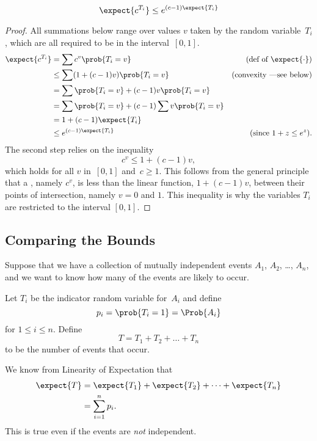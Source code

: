 \begin{lemma}
\label{chernoff-lemma2}
\[
    \expect{c^{T_i}} \leq e^{(c - 1) \expect{T_i}}
\]
\end{lemma}

\begin{proof}
All summations below range over values $v$ taken by the random
variable~$T_i$, which are all required to be in the interval~$[0, 1]$.
\begin{align*}
\expect{c^{T_i}}
     & = \sum c^v \prob{T_i = v}
              & \text{(def of $\expect{\cdot}$)}\\
     & \leq \sum (1 + (c-1) v) \prob{T_i = v} 
          & \text{(convexity ---see below)}\\
     & = \sum \prob{T_i = v} + (c-1) v \prob{T_i = v} \\
     & = \sum \prob{T_i = v} +  (c-1) \sum v \prob{T_i = v} \\
     & = 1 + (c - 1) \expect{T_i} \\
     & \leq e^{(c - 1) \expect{T_i}}
           & \text{(since $1 + z \leq e^z$)}.
\end{align*}
The second step relies on the inequality
\[
c^v \leq 1 + (c-1) v,
\]
which holds for all $v$ in~$[0,1]$ and~$c \geq 1$.  This follows from
the general principle that a , namely $c^v$, is
less than the linear function, $1 + (c-1) v$, between their points of
intersection, namely $v = 0$ and $1$.  This inequality is why the
variables $T_i$ are restricted to the interval $[0, 1]$.
\end{proof}

\subsection{Comparing the Bounds}

Suppose that we have a collection of mutually independent events $A_1$,
$A_2$, \dots, $A_n$, and we want to know how many of the events are
likely to occur.

Let $T_i$ be the indicator random variable for~$A_i$ and define
\begin{equation*}
    p_i = \prob{T_i = 1} = \Prob{A_i}
\end{equation*}
for $1 \le i \le n$.  Define
\begin{equation*}
    T = T_1 + T_2 + \dots + T_n
\end{equation*}
to be the number of events that occur.

We know from Linearity of Expectation that
\begin{align*}
\expect{T}
    &= \expect{T_1} + \expect{T_2} + \dots + \expect{T_n} \\
    &= \sum_{i = 1}^n p_i.
\end{align*}
This is true even if the events are \emph{not} independent.

